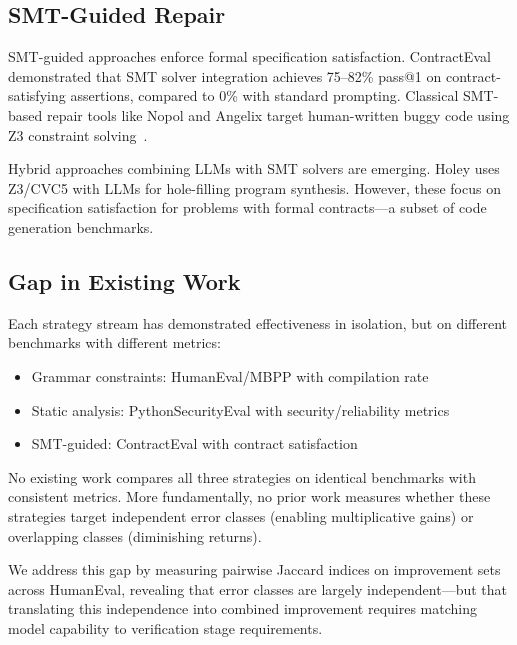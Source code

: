\subsection{SMT-Guided Repair}

SMT-guided approaches enforce formal specification satisfaction. ContractEval~\cite{lim2025contracteval} demonstrated that SMT solver integration achieves 75--82\% pass@1 on contract-satisfying assertions, compared to 0\% with standard prompting. Classical SMT-based repair tools like Nopol and Angelix target human-written buggy code using Z3 constraint solving~\cite{z3solver}.

Hybrid approaches combining LLMs with SMT solvers are emerging. Holey uses Z3/CVC5 with LLMs for hole-filling program synthesis. However, these focus on specification satisfaction for problems with formal contracts---a subset of code generation benchmarks.

\subsection{Gap in Existing Work}

Each strategy stream has demonstrated effectiveness in isolation, but on different benchmarks with different metrics:

\begin{itemize}
    \item Grammar constraints: HumanEval/MBPP with compilation rate
    \item Static analysis: PythonSecurityEval with security/reliability metrics
    \item SMT-guided: ContractEval with contract satisfaction
\end{itemize}

No existing work compares all three strategies on identical benchmarks with consistent metrics. More fundamentally, no prior work measures whether these strategies target independent error classes (enabling multiplicative gains) or overlapping classes (diminishing returns).

We address this gap by measuring pairwise Jaccard indices on improvement sets across HumanEval, revealing that error classes are largely independent---but that translating this independence into combined improvement requires matching model capability to verification stage requirements.
